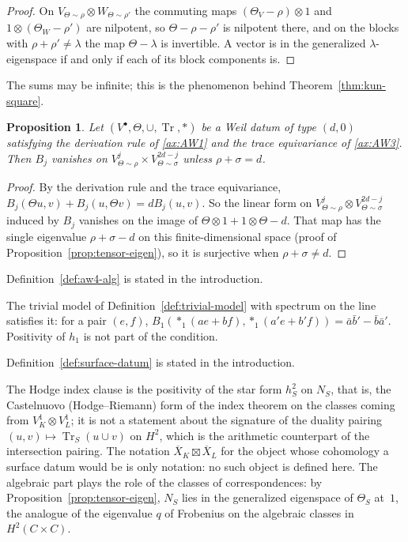 \documentclass[11pt]{amsart}
\theoremstyle{plain}
\newtheorem{proposition}[theorem]{Proposition}
\theoremstyle{definition}
\theoremstyle{remark}
\numberwithin{equation}{section}
\newcommand{\Xbar}{\overline{X}}
\DeclareMathOperator{\Tr}{Tr}
\begin{document}
\begin{proof}
On $V_{\Theta\sim\rho}\otimes W_{\Theta\sim\rho'}$ the commuting maps
$(\Theta_V-\rho)\otimes1$ and $1\otimes(\Theta_W-\rho')$ are nilpotent,
so $\Theta-\rho-\rho'$ is nilpotent there, and on the blocks with
$\rho+\rho'\ne\lambda$ the map $\Theta-\lambda$ is invertible. A vector
is in the generalized $\lambda$-eigenspace if and only if each of its
block components is.
\end{proof}

The sums may be infinite; this is the phenomenon behind
Theorem~\ref{thm:kun-square}.

\begin{proposition}\label{prop:B-support}
Let $(V^\bullet,\Theta,\cup,\Tr,*)$ be a Weil datum of type $(d,0)$
satisfying the derivation rule of \ref{ax:AW1} and the trace
equivariance of \ref{ax:AW3}. Then $B_j$ vanishes on
$V^j_{\Theta\sim\rho}\times V^{2d-j}_{\Theta\sim\sigma}$ unless
$\rho+\sigma=d$.
\end{proposition}

\begin{proof}
By the derivation rule and the trace equivariance,
$B_j(\Theta u,v)+B_j(u,\Theta v)=dB_j(u,v)$. So the linear form on
$V^j_{\Theta\sim\rho}\otimes V^{2d-j}_{\Theta\sim\sigma}$ induced by
$B_j$ vanishes on the image of $\Theta\otimes1+1\otimes\Theta-d$.
That map has the single eigenvalue $\rho+\sigma-d$ on this
finite-dimensional space (proof of Proposition~\ref{prop:tensor-eigen}),
so it is surjective when $\rho+\sigma\ne d$.
\end{proof}

Definition~\ref{def:aw4-alg} is stated in the introduction.


The trivial model of Definition~\ref{def:trivial-model} with spectrum on
the line satisfies it: for a pair $(e,f)$,
$B_1(*_1(ae+bf),*_1(a'e+b'f))=\bar a\bar b'-\bar b\bar a'$. Positivity of
$h_1$ is not part of the condition.

Definition~\ref{def:surface-datum} is stated in the introduction.


The Hodge index clause is the positivity of the star form $h_S^2$ on
$N_S$, that is, the Castelnuovo (Hodge--Riemann) form of the index
theorem on the classes coming from $V^1_K\otimes V^1_L$; it is not a
statement about the signature of the duality pairing
$(u,v)\mapsto\Tr_S(u\cup v)$ on $H^2$, which is the arithmetic
counterpart of the intersection pairing. The notation
$\Xbar_K\boxtimes\Xbar_L$ for the object whose cohomology a
surface datum would be is only notation: no such object is defined here.
The algebraic part plays the role of the classes of correspondences: by
Proposition~\ref{prop:tensor-eigen}, $N_S$ lies in the generalized
eigenspace of $\Theta_S$ at~$1$, the analogue of the eigenvalue $q$ of
Frobenius on the algebraic classes in $H^2(C\times C)$.
\end{document}
